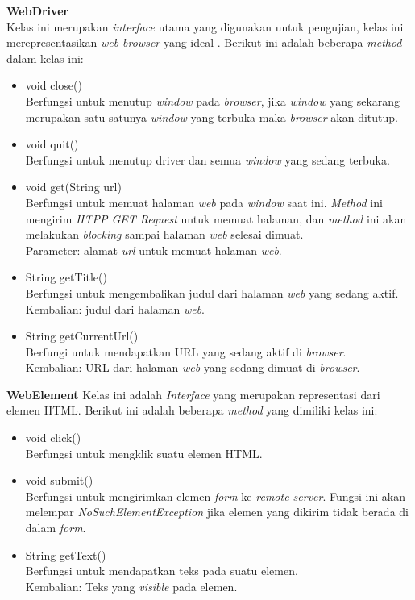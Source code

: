\documentclass[a4paper,twoside]{article}
\begin{document}
\begin{enumerate}
\textbf{WebDriver}\\
Kelas ini merupakan \textit{interface} utama yang digunakan untuk pengujian, kelas ini merepresentasikan \textit{web browser} yang ideal . Berikut ini adalah beberapa \textit{method} dalam kelas ini:
\begin{itemize}
\item void close()\\
Berfungsi untuk menutup \textit{window} pada \textit{browser}, jika \textit{window} yang sekarang merupakan satu-satunya \textit{window} yang terbuka maka \textit{browser} akan ditutup.
\item void quit()\\
Berfungsi untuk menutup driver dan semua \textit{window} yang sedang terbuka.
\item void get(String url)\\
Berfungsi untuk memuat halaman \textit{web} pada \textit{window} saat ini. \textit{Method} ini mengirim \textit{HTPP GET Request} untuk memuat halaman, dan \textit{method} ini akan melakukan \textit{blocking} sampai halaman \textit{web} selesai dimuat.\\
Parameter: alamat \textit{url} untuk memuat halaman \textit{web}.
\item String getTitle()\\
Berfungsi untuk mengembalikan judul dari halaman \textit{web} yang sedang aktif.\\
Kembalian: judul dari halaman \textit{web}.
\item String getCurrentUrl()\\
Berfungi untuk mendapatkan URL yang sedang aktif di \textit{browser}.\\
Kembalian: URL dari halaman \textit{web} yang sedang dimuat di \textit{browser}.
\end{itemize}

\textbf{WebElement}
Kelas ini adalah \textit{Interface} yang  merupakan representasi dari elemen HTML. Berikut ini adalah beberapa \textit{method} yang dimiliki kelas ini:
\begin{itemize}
\item void click()\\
Berfungsi untuk mengklik suatu elemen HTML.
\item void submit()\\
Berfungsi untuk mengirimkan elemen \textit{form} ke \textit{remote server}. Fungsi ini akan melempar \textit{NoSuchElementException} jika elemen yang dikirim tidak berada di dalam \textit{form}. 
\item String getText()\\
Berfungsi untuk mendapatkan teks pada suatu elemen.\\
Kembalian: Teks yang \textit{visible} pada elemen.


\end{itemize}
\end{enumerate}
\end{document}
